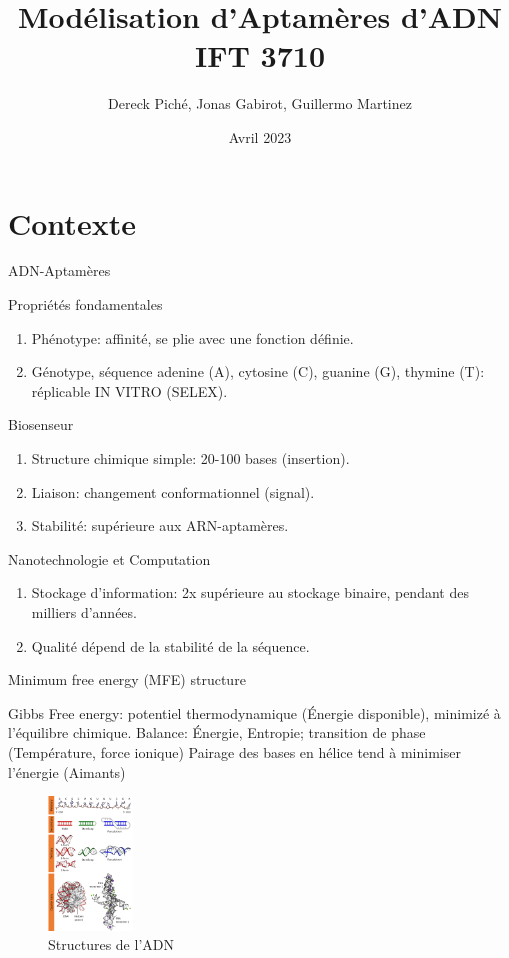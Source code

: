 \documentclass{beamer}
\title{Modélisation d'Aptamères d'ADN IFT 3710}
\author{Dereck Piché, Jonas Gabirot, Guillermo Martinez}
\institute{Université de Montréal}
\date{Avril 2023}
\begin{document}
\frame{\titlepage}

\section{Contexte}
\begin{frame}{ADN-Aptamères}
\begin{block}{Propriétés fondamentales}
\begin{enumerate}
    \item Phénotype: affinité, se plie avec une fonction définie.
    \item Génotype, séquence adenine (A), cytosine (C), guanine (G), thymine (T): réplicable IN VITRO (SELEX).
\end{enumerate}
\end{block}

\begin{block}{Biosenseur}
\begin{enumerate}
    \item Structure chimique simple: 20-100 bases (insertion).
    \item Liaison: changement conformationnel (signal).
    \item Stabilité: supérieure aux ARN-aptamères.
\end{enumerate}
\end{block}

\begin{block}{Nanotechnologie et Computation}
\begin{enumerate}
    \item Stockage d'information: 2x supérieure au stockage binaire, pendant des milliers d'années.
    \item Qualité dépend de la stabilité de la séquence.
\end{enumerate}
\end{block}

\end{frame}

\begin{frame}{Minimum free energy (MFE) structure}

Gibbs Free energy: potentiel thermodynamique (Énergie disponible), minimizé à l'équilibre chimique.
Balance: Énergie, Entropie; transition de phase (Température, force ionique)
Pairage des bases en  hélice tend à minimiser l'énergie (Aimants)

\begin{figure} \label{fig:ADN_structure}
    \caption{Structures de l'ADN} \center
    \includegraphics[width=0.2\textwidth]{images/DNA_structure.png}
\end{figure}

\end{frame}
\end{document}
